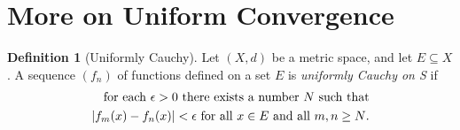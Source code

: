 \documentclass[12pt, lettersize]{book}
\theoremstyle{plain}
\newtheorem{thm}{Theorem}[section]
\theoremstyle{definition}
\newtheorem{dfn}[thm]{Definition}
\theoremstyle{remark}
\begin{document}
		\section{More on Uniform Convergence}
			\begin{comment}
			Here are two important facts about integration
			\begin{enumerate}
				\item If $g$ and $h$ are integrable on $[a,b]$ and if $g(x)\leq h(x)$ for all $x\in[a,b]$, then $\int_{a}^{b}g(x)dx\leq\int_{a}^{b}h(x)dx$.
				\item If $g$ is integrable on $[a,b]$, then
				\begin{displaymath}
					\abs{\int_{a}^{b}g(x)dx}\leq\int_{a}^{b}\abs{g(x)}dx.
				\end{displaymath}
			\end{enumerate}
			Also continuous functions on closed intervals are integrable.
			
			\begin{thm}\label{thm:25.2}
			Let $(f_n)$ be a sequence of continuous functions on $[a,b]$, and suppose $f_n\rightarrow f$ uniformly on $[a,b]$. Then
			\begin{displaymath}
				\lim\limits_{n\rightarrow\infty}\int_{a}^{b}f_n(x)dx=\int_{a}^{b}f(x)dx.
			\end{displaymath}
			\begin{proof}
			By \ref{def:24.3} $f$is continuous, so $f_n-f$ are all integrable on $[a,b]$. Let $\epsilon>0$. Since $f_n\rightarrow f$ uniformly on $[a,b]$, there exists $N$ such that $\abs{f_n(x)-f(x)}<\frac{\epsilon}{b-a}$ for all $x\in[a,b]$ and all $n>N$. Consequently $n>N$ implies
			\begin{align*}
				\abs{\int_{a}^{b}f_n(x)dx-\int_{a}^{b}f(x)dx}&=\abs{\int_{a}^{b}[f_n(x)-f(x)]dx}\\
															 &\leq\int_{a}^{b}\abs{f_n(x)-f(x)}dx\\
															 &\leq\int_{a}^{b}\frac{\epsilon}{b-a}dx\\
															 &=\epsilon
			\end{align*}
			Thus $\lim\limits_{n\rightarrow\infty}\int_{a}^{b}f_n(x)dx=\int_{a}^{b}f(x)dx$.
			\end{proof}
			\end{thm}
			\end{comment}
			
			\begin{dfn}[Uniformly Cauchy]
			Let $(X,d)$ be a metric space, and let $E\subseteq X$. A sequence $(f_n)$ of functions defined on a set $E$ is \emph{uniformly Cauchy on S} if
			\begin{align*}
				\text{for each $\epsilon>0$ there exists a number $N$ such that}\\
				\text{$\abs{f_m(x)-f_n(x)}<\epsilon$ for all $x\in E$ and all $m,n\geq N$.}
			\end{align*}
			\end{dfn}
			
\end{document}
